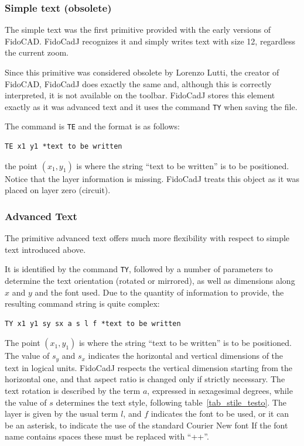 \documentclass[10pt,a4paper,twoside]{scrreprt}
\begin{document}
\subsubsection{Simple text (obsolete)}

The simple text  was the first primitive provided
with the early versions of FidoCAD. FidoCadJ recognizes
it and simply writes text with size 12, regardless the current zoom.

Since this primitive was considered obsolete by Lorenzo
Lutti, the creator of FidoCAD,
FidoCadJ does exactly the same and, although this is correctly interpreted,
it is not available on the toolbar. FidoCadJ stores this element
exactly as it was advanced text and it uses the command \lstinline!TY!
when saving the file.

The command is \lstinline!TE! and the format is as follows:
\begin{lstlisting}
TE x1 y1 *text to be written
\end{lstlisting}
the point $(x_{1},y_{1})$ is where the string ``text to be written''
is to be positioned. Notice that the layer information is missing.
FidoCadJ treats this object as it was placed on layer zero (circuit).

\subsubsection{Advanced Text}

The primitive advanced text offers much more
flexibility with respect to simple text introduced
above.

It is identified by the command \lstinline!TY!, followed
by a number of parameters to determine the text orientation (rotated
or mirrored), as well as dimensions along $x$
and $y$ and the font used. Due to the quantity of information to
provide, the resulting command string is quite complex:
\begin{lstlisting}
TY x1 y1 sy sx a s l f *text to be written
\end{lstlisting}
The point $(x_{1},y_{1})$ is where the string ``text to be written''
is to be positioned. The value of $s_{y}$ and $s_{x}$ indicates the
horizontal and vertical dimensions of the text in logical units.
FidoCadJ respects the vertical dimension starting from
the horizontal one, and that aspect ratio is changed only if strictly necessary. The text rotation is described by the term
$a$, expressed in sexagesimal degrees, while the value of $s$ determines
the text style, following table~\ref{tab_stile_testo}.
The layer is given by the usual term $l$, and $f$ indicates the
font to be used, or it can be an asterisk, to indicate
the use of the standard Courier New font If the font
name contains spaces these must be replaced with ``++''\index{++}.
\end{document}
